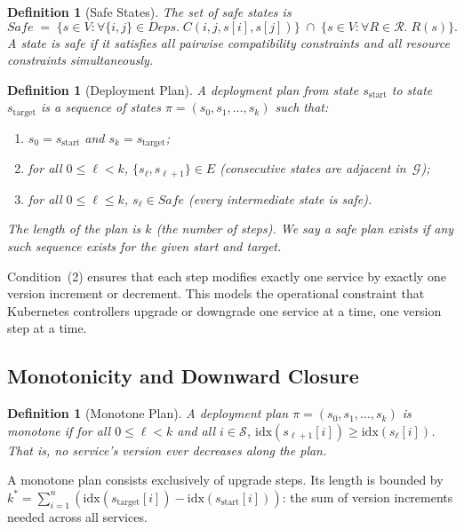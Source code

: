 \documentclass[10pt,twocolumn]{article}
\newtheorem{definition}[theorem]{Definition}
\begin{document}
\begin{definition}[Safe States]
\label{def:safe}
The set of \emph{safe states} is
\[
  \mathit{Safe} \;=\;
  \bigl\{s \in V : \forall \{i,j\} \in \mathit{Deps}.\;
    C(i,j,s[i],s[j])\bigr\}
  \;\cap\;
  \bigl\{s \in V : \forall R \in \mathcal{R}.\; R(s)\bigr\}.
\]
A state is safe if it satisfies all pairwise compatibility constraints and
all resource constraints simultaneously.
\end{definition}

\begin{definition}[Deployment Plan]
\label{def:plan}
A \emph{deployment plan} from state $s_{\mathrm{start}}$ to state
$s_{\mathrm{target}}$ is a sequence of states
$\pi = (s_0, s_1, \ldots, s_k)$ such that:
\begin{enumerate}
\item $s_0 = s_{\mathrm{start}}$ and $s_k = s_{\mathrm{target}}$;
\item for all $0 \leq \ell < k$, $\{s_\ell, s_{\ell+1}\} \in E$
  (consecutive states are adjacent in~$\mathcal{G}$);
\item for all $0 \leq \ell \leq k$, $s_\ell \in \mathit{Safe}$
  (every intermediate state is safe).
\end{enumerate}
The \emph{length} of the plan is $k$ (the number of steps).  We say a safe
plan \emph{exists} if any such sequence exists for the given start and
target.
\end{definition}

\noindent
Condition~(2) ensures that each step modifies exactly one service by
exactly one version increment or decrement.  This models the operational
constraint that Kubernetes controllers upgrade or downgrade one service at
a time, one version step at a time.

\subsection{Monotonicity and Downward Closure}
\label{sec:formal:monotone}

\begin{definition}[Monotone Plan]
\label{def:monotone}
A deployment plan $\pi = (s_0, s_1, \ldots, s_k)$ is \emph{monotone} if
for all $0 \leq \ell < k$ and all $i \in \mathcal{S}$,
$\mathrm{idx}(s_{\ell+1}[i]) \geq \mathrm{idx}(s_\ell[i])$.  That is, no
service's version ever decreases along the plan.
\end{definition}

\noindent
A monotone plan consists exclusively of upgrade steps.  Its length is
bounded by $k^* = \sum_{i=1}^{n}
(\mathrm{idx}(s_{\mathrm{target}}[i]) - \mathrm{idx}(s_{\mathrm{start}}[i]))$:
the sum of version increments needed across all services.
\end{document}
